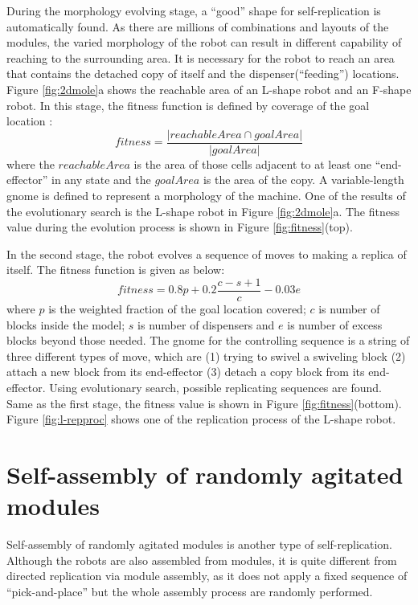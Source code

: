 \documentclass[12pt,twoside]{article}
\theoremstyle{plain}
\theoremstyle{definition}
\theoremstyle{remark}
\begin{document}
During the morphology evolving stage, a ``good'' shape for self-replication is automatically found. As there are millions of combinations and layouts of the modules, the varied morphology of the robot can result in different capability of reaching to the surrounding area. It is necessary for the robot to reach an area that contains the detached copy of itself and the dispenser(``feeding'') locations. Figure \ref{fig:2dmole}a shows the reachable area of an L-shape robot and an F-shape robot. In this stage, the fitness function is defined by coverage of the goal location :
\[ fitness = \frac{|reachableArea \cap goalArea|}{|goalArea|} \] where the $reachableArea$ is the area of those cells adjacent to at least one ``end-effector'' in any state and the $goalArea$ is the area of the copy. A variable-length gnome is defined to represent a morphology of the machine. One of the results of the evolutionary search is the L-shape robot in Figure \ref{fig:2dmole}a. The fitness value during the evolution process is shown in Figure \ref{fig:fitness}(top).

In the second stage, the robot evolves a sequence of moves to making a replica of itself. The fitness function is given as below: 
\[ fitness = 0.8p + 0.2 \frac{c - s + 1}{c} - 0.03 e \] 
where $p$ is the weighted fraction of the goal location covered; $c$ is number of blocks inside the model; $s$ is number of dispensers and $e$ is number of excess blocks beyond those needed. The gnome for the controlling sequence is a string of three different types of move, which are (1) trying to swivel a swiveling block (2) attach a new block from its end-effector (3) detach a copy block from its end-effector. Using evolutionary search, possible replicating sequences are found. Same as the first stage, the fitness value is shown in  Figure \ref{fig:fitness}(bottom). Figure \ref{fig:l-repproc} shows one of the replication process of the L-shape robot.

\section{Self-assembly of randomly agitated modules}
\label{sec:random}

Self-assembly of randomly agitated modules is another type of self-replication. Although the robots are also assembled from modules, it is quite different from directed replication via module assembly, as it does not apply a fixed sequence of ``pick-and-place'' but the whole assembly process are randomly performed. 
\end{document}
